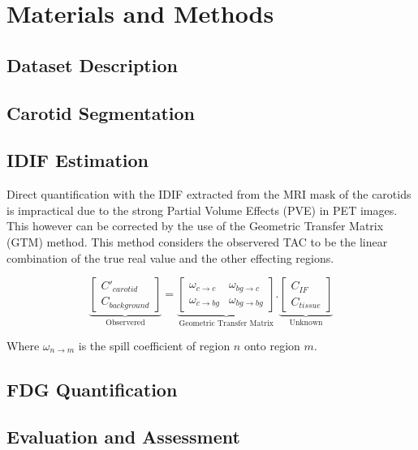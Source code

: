 \chapter{Materials and Methods}

\section{Dataset Description}
\lipsum[1-1]
\section{Carotid Segmentation}
\lipsum[1-3]
\section{IDIF Estimation}
Direct quantification with the IDIF extracted from the MRI mask of the carotids is impractical due to the strong Partial Volume Effects (PVE) in PET images. This however can be corrected by the use of the Geometric Transfer Matrix (GTM) method. This method considers the observered TAC to be the linear combination of the true real value and the other effecting regions.

\[
	\underbrace{
		\begin{bmatrix}
			C'_{carotid} \\
			C_{background}
		\end{bmatrix}
	}_{\text{Observered}}
	=
	\underbrace{
		\begin{bmatrix}
			\omega_{c \rightarrow c}  & \omega_{bg \rightarrow c}  \\
			\omega_{c \rightarrow bg} & \omega_{bg \rightarrow bg}
		\end{bmatrix}
	}_{\text{Geometric Transfer Matrix}}
	.
	\underbrace{
		\begin{bmatrix}
			C_{IF} \\
			C_{tissue}
		\end{bmatrix}
	}_{\text{Unknown}}
\]

Where $\omega_{n \rightarrow m}$ is the spill coefficient of region $n$ onto region $m$.


\section{FDG Quantification}
\lipsum[1-3]
\section{Evaluation and Assessment}
\lipsum[1-1]
